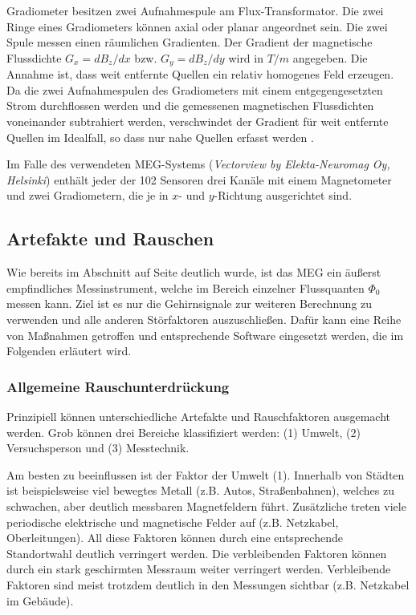 \documentclass[doc,a4paper,12pt]{apa6}
\makeatletter
\DeclareRobustCommand*{\nameref}[1]{%
      \glqq{\myorg@nameref{#1}}\grqq%
    }%
\makeatother
\begin{document}
Gradiometer besitzen zwei Aufnahmespule am Flux-Transformator. Die zwei Ringe eines Gradiometers können axial oder planar angeordnet sein. Die zwei Spule messen einen räumlichen Gradienten. Der Gradient der magnetische Flussdichte $G_x = dB_z/dx$ bzw. $G_y = dB_z/dy$ wird in $T/m$ angegeben. Die Annahme ist, dass weit entfernte Quellen ein relativ homogenes Feld erzeugen. Da die zwei Aufnahmespulen des Gradiometers mit einem entgegengesetzten Strom durchflossen werden und die gemessenen magnetischen Flussdichten voneinander subtrahiert werden, verschwindet der Gradient für weit entfernte Quellen im Idealfall, so dass nur nahe Quellen erfasst werden \parencite{hansen2010meg}.

Im Falle des verwendeten MEG-Systems (\emph{Vectorview by Elekta-Neuromag Oy, Helsinki}) enthält jeder der 102 Sensoren drei Kanäle mit einem Magnetometer und zwei Gradiometern, die je in $x$- und $y$-Richtung ausgerichtet sind.

\subsection{Artefakte und Rauschen}

Wie bereits im Abschnitt \nameref{sec:squids} auf Seite \pageref{sec:squids} deutlich wurde, ist das MEG ein äußerst empfindliches Messinstrument, welche im Bereich einzelner Flussquanten $\Phi_0$ messen kann. Ziel ist es nur die Gehirnsignale zur weiteren Berechnung zu verwenden und alle anderen Störfaktoren auszuschließen. Dafür kann eine Reihe von Maßnahmen getroffen und entsprechende Software eingesetzt werden, die im Folgenden erläutert wird.

\subsubsection{Allgemeine Rauschunterdrückung}
\label{sec:rauschen}

Prinzipiell können unterschiedliche Artefakte und Rauschfaktoren ausgemacht werden. Grob können drei Bereiche klassifiziert werden: (1) Umwelt, (2) Versuchsperson und (3) Messtechnik.

Am besten zu beeinflussen ist der Faktor der Umwelt (1). Innerhalb von Städten ist beispielsweise viel bewegtes Metall (z.B. Autos, Straßenbahnen), welches zu schwachen, aber deutlich messbaren Magnetfeldern führt. Zusätzliche treten viele periodische elektrische und magnetische Felder auf (z.B. Netzkabel, Oberleitungen). All diese Faktoren können durch eine entsprechende Standortwahl deutlich verringert werden. Die verbleibenden Faktoren können durch ein stark geschirmten Messraum weiter verringert werden. Verbleibende Faktoren sind meist trotzdem deutlich in den Messungen sichtbar (z.B. Netzkabel im Gebäude).
\end{document}
